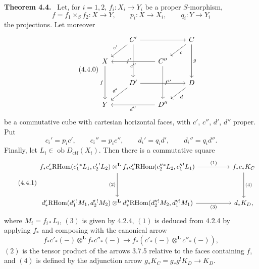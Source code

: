 \documentclass[11pt]{article}
\newenvironment{statement}[1]{\par\medskip\noindent\textbf{#1.}\ }{\par\medskip}
\newcommand{\ob}{\operatorname{ob}}
\providecommand{\RHom}{\mathrm{RHom}}
\providecommand{\Dctf}{D_{\mathrm{ctf}}}
\providecommand{\Dctf}{D_{\mathrm{ctf}}}
\providecommand{\RHom}{\mathrm{RHom}}
\providecommand{\ob}{\operatorname{ob}}
\providecommand{\RHom}{\mathrm R\mathcal{H}om}
\providecommand{\RHom}{\mathrm{RHom}}
\begin{document}
\begin{statement}{Theorem 4.4}
Let, for $i=1,2$, $f_i:X_i\longrightarrow Y_i$ be a proper $S$-morphism,
\[
f=f_1\times_S f_2:X\longrightarrow Y,\qquad
p_i:X\longrightarrow X_i,\qquad q_i:Y\longrightarrow Y_i
\]
the projections. Let moreover
\begin{equation}
\tag{4.4.0}
\begin{tikzcd}[column sep=2.1em,row sep=1.6em]
& C' \arrow[rr] \arrow[dl,"c'"'] \arrow[dd,"f'"'] && C \arrow[dl,"c"] \arrow[dd,"g"] \\
X \arrow[dd,"f"'] && C'' \arrow[ll,"c''"] \arrow[dd,"f''"] \\
& D' \arrow[rr] \arrow[dl,"d'"'] && D \arrow[dl,"d"] \\
Y && D'' \arrow[ll,"d''"]
\end{tikzcd}
\end{equation}
be a commutative cube with cartesian horizontal faces, with $c'$, $c''$, $d'$, $d''$ proper. Put
\[
c_i'=p_i c',\qquad c_i''=p_i c'',\qquad d_i'=q_i d',\qquad d_i''=q_i d''.
\]
Finally, let $L_i\in\ob \Dctf(X_i)$. Then there is a commutative square
\begin{equation}
\tag{4.4.1}
\begin{tikzcd}[column sep=huge,row sep=huge]
f_*c'_*\RHom(c_1'{}^*L_1,c_2'{}^!L_2)\otimes^{\mathbf L}
f_*c''_*\RHom(c_2''{}^*L_2,c_1''{}^!L_1)
 \arrow[r,"(1)"] \arrow[d,"(2)"'] &
f_*c_*K_C \arrow[d,"(4)"] \\
d'_*\RHom(d_1'{}^!M_1,d_2'{}^!M_2)\otimes^{\mathbf L}
d''_*\RHom(d_2''{}^!M_2,d_1''{}^!M_1)
 \arrow[r,"(3)"'] &
d_*K_D ,
\end{tikzcd}
\end{equation}
where $M_i=f_{i*}L_i$, $(3)$ is given by 4.2.4, $(1)$ is deduced from 4.2.4 by applying $f_*$ and composing with the canonical arrow
\[
f_*c'_*(-)\otimes^{\mathbf L} f_*c''_*(-)\longrightarrow f_*(c'_*(-)\otimes^{\mathbf L}c''_*(-)),
\]
$(2)$ is the tensor product of the arrows 3.7.5 relative to the faces containing $f$, and $(4)$ is defined by the adjunction arrow $g_*K_C=g_*g^!K_D\longrightarrow K_D$.
\end{statement}
\end{document}
